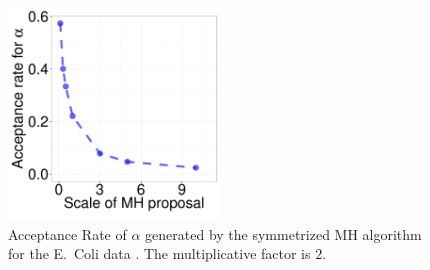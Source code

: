   \begin{figure}[H]
  \centering

  \begin{minipage}[!hp]{0.99\linewidth}
	\centering
    \includegraphics [width=0.50\textwidth, angle=0]{figs/acc/ecolialpha_k2.pdf}
  \end{minipage}
    \caption{Acceptance Rate of $\alpha$ generated by the symmetrized MH algorithm for the E.\ Coli data . The multiplicative factor is $2$. }
     \label{fig:ACC_ECOLI}
  \end{figure}
